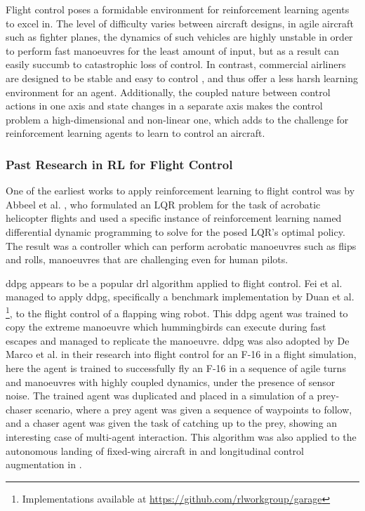 \documentclass[../report.tex]{subfiles}
\begin{document}
Flight control poses a formidable environment for reinforcement learning agents to excel in. The level of difficulty varies between aircraft designs, in agile aircraft such as fighter planes, the dynamics of such vehicles are highly unstable \cite{unstable_1, unstable_2, unstable_3} in order to perform fast manoeuvres for the least amount of input, but as a result can easily succumb to catastrophic loss of control. In contrast, commercial airliners are designed to be stable and easy to control \cite{stable_1, stable_2}, and thus offer a less harsh learning environment for an agent. Additionally, the coupled nature between control actions in one axis and state changes in a separate axis makes the control problem a high-dimensional and non-linear one, which adds to the challenge for reinforcement learning agents to learn to control an aircraft.

\subsubsection{Past Research in RL for Flight Control}

One of the earliest works to apply reinforcement learning to flight control was by Abbeel et al. \cite{abbeel2006application}, who formulated an LQR problem for the task of acrobatic helicopter flights and used a specific instance of reinforcement learning named differential dynamic programming to solve for the posed LQR's optimal policy. The result was a controller which can perform acrobatic manoeuvres such as flips and rolls, manoeuvres that are challenging even for human pilots. 

\ac{ddpg} appears to be a popular \ac{drl} algorithm applied to flight control. Fei et al. \cite{flappy_bird}managed to apply \ac{ddpg}, specifically a benchmark implementation by Duan et al. \cite{benchmark_drl_algos}\footnote{Implementations available at \url{https://github.com/rlworkgroup/garage}}, to the flight control of a flapping wing robot. This \ac{ddpg} agent was trained to copy the extreme manoeuvre which hummingbirds can execute during fast escapes and managed to replicate the manoeuvre. \ac{ddpg} was also adopted by De Marco et al. \cite{de2023deep} in their research into flight control for an F-16 in a flight simulation, here the agent is trained to successfully fly an F-16 in a sequence of agile turns and manoeuvres with highly coupled dynamics, under the presence of sensor noise. The trained agent was duplicated and placed in a simulation of a prey-chaser scenario, where a prey agent was given a sequence of waypoints to follow, and a chaser agent was given the task of catching up to the prey, showing an interesting case of multi-agent interaction. This algorithm was also applied to the autonomous landing of fixed-wing aircraft in \cite{ddpg_landing} and longitudinal control augmentation in \cite{ddpg_lcas}.
\end{document}
